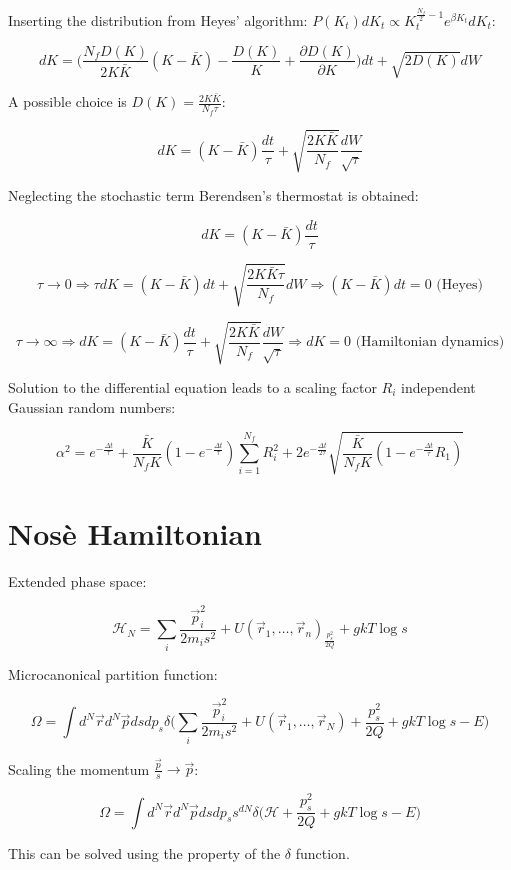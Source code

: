 Inserting the distribution from Heyes' algorithm: $P(K_t)dK_t\propto K_t^{\frac{N_f}{2}-1}e^{\beta K_t}dK_t$:

$$dK = \biggl(\frac{N_f D(K)}{2K\bar{K}}(K-\bar{K}) - \frac{D(K)}{K} + \frac{\partial D(K)}{\partial K}\biggr) dt + \sqrt{2D(K)}dW$$

A possible choice is $D(K) = \frac{2K\bar{K}}{N_f\tau}$:

$$dK = (K-\bar{K})\frac{dt}{\tau}+\sqrt{\frac{2K\bar{K}}{N_f}}\frac{dW}{\sqrt{\tau}}$$

Neglecting the stochastic term Berendsen's thermostat is obtained:

$$dK = (K-\bar{K})\frac{dt}{\tau}$$

$$\tau\rightarrow 0\Rightarrow \tau dK = (K-\bar{K})dt + \sqrt{\frac{2K\bar{K}\tau}{N_f}}dW\Rightarrow (K-\bar{K})dt = 0 \text{ (Heyes)}$$

$$\tau\rightarrow\infty\Rightarrow dK = (K-\bar{K})\frac{dt}{\tau} + \sqrt{\frac{2K\bar{K}}{N_f}}\frac{dW}{\sqrt{\tau}}\Rightarrow dK = 0\text{ (Hamiltonian dynamics)}$$

Solution to the differential equation leads to a scaling factor $R_i$ independent Gaussian random numbers:

$$\alpha^2 = e^{-\frac{\Delta t}{\tau}} + \frac{\bar{K}}{N_fK}(1-e^{-\frac{\Delta t}{\tau}})\sum\limits_{i=1}^{N_f}R_i^2+2e^{-\frac{\Delta t}{2\tau}}\sqrt{\frac{\bar{K}}{N_f K}(1-e^{-\frac{\Delta t}{\tau}}R_1)}$$

\section{Nos\`e Hamiltonian}
Extended phase space:

$$\mathcal{H}_N = \sum\limits_i\frac{\vec{p}_i^2}{2m_is^2} + U(\vec{r}_1, \dots, \vec{r}_n)_ \frac{p_s^2}{2Q}+ gkT\log s$$

Microcanonical partition function:

$$\Omega = \int d^N\vec{r}d^N\vec{p}dsdp_s\delta\biggl(\sum\limits_{i}\frac{\vec{p}_i^2}{2m_is^2} + U(\vec{r}_1, \dots, \vec{r}_N) + \frac{p_s^2}{2Q} + gkT\log s - E\biggr)$$

Scaling the momentum $\frac{\vec{p}}{s}\rightarrow \vec{p}$:

$$\Omega = \int d^N\vec{r}d^N\vec{p}dsdp_ss^{dN}\delta\biggl(\mathcal{H}+\frac{p_s^2}{2Q} + gkT\log s - E\biggr)$$

This can be solved using the property of the $\delta$ function.

